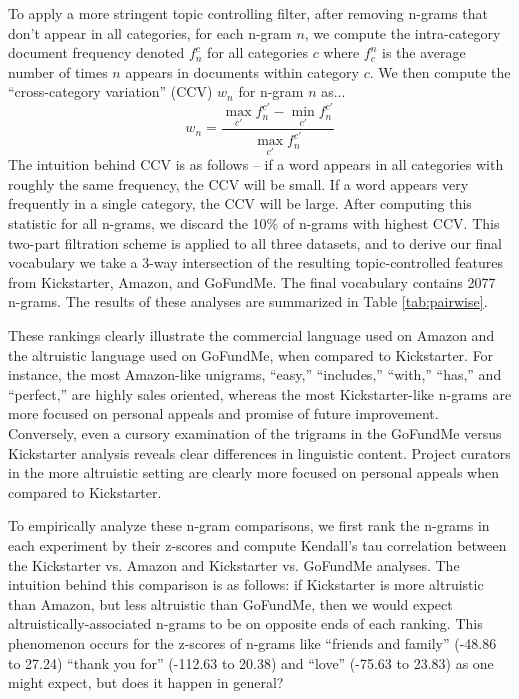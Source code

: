 \documentclass[letterpaper]{article}
\begin{document}
To apply a more stringent topic controlling filter, after removing n-grams that don't appear in all categories, for each n-gram $n$, we compute the intra-category document frequency denoted $f_n^c$ for all categories $c$ where $f^n_c$ is the average number of times $n$ appears in documents within category $c$. We then compute the ``cross-category variation'' (CCV) $w_n$ for n-gram $n$ as...
\begin{equation} \label{eq:width}
w_n = \frac{\max\limits_{c'}f_n^{c'} - \min\limits_{c'}f_n^{c'}}{\max\limits_{c'}f_n^{c'}}
\end{equation}
The intuition behind CCV is as follows -- if a word appears in all categories with roughly the same frequency, the CCV will be small. If a word appears very frequently in a single category, the CCV will be large. After computing this statistic for all n-grams, we discard the 10\% of n-grams with highest CCV. This two-part filtration scheme is applied to all three datasets, and to derive our final vocabulary we take a 3-way intersection of the resulting topic-controlled features from Kickstarter, Amazon, and GoFundMe. The final vocabulary contains 2077 n-grams. The results of these analyses are summarized in Table \ref{tab:pairwise}.

These rankings clearly illustrate the commercial language used on Amazon and the altruistic language used on GoFundMe, when compared to Kickstarter. For instance, the most Amazon-like unigrams, ``easy,'' ``includes,'' ``with,'' ``has,'' and ``perfect,'' are highly sales oriented, whereas the most Kickstarter-like n-grams are more focused on personal appeals and promise of future improvement. Conversely, even a cursory examination of the trigrams in the GoFundMe versus Kickstarter analysis reveals clear differences in linguistic content. Project curators in the more altruistic setting are clearly more focused on personal appeals when compared to Kickstarter.


To empirically analyze these n-gram comparisons, we first rank the n-grams in each experiment by their z-scores and compute Kendall's tau correlation between the Kickstarter vs. Amazon and Kickstarter vs. GoFundMe analyses. The intuition behind this comparison is as follows: if Kickstarter is more altruistic than Amazon, but less altruistic than GoFundMe, then we would expect altruistically-associated n-grams to be on opposite ends of each ranking. This phenomenon occurs for the z-scores of n-grams like ``friends and family'' (-48.86 to 27.24) ``thank you for'' (-112.63 to 20.38) and ``love'' (-75.63 to 23.83) as one might expect, but does it happen in general?
\end{document}

